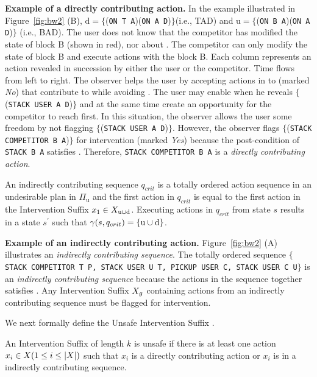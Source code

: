 \textbf{Example of a directly contributing action.} 
In the example illustrated in Figure~\ref{fig:bw2} (B), $\mathrm{d}=\lbrace$(\texttt{ON T A})(\texttt{ON A D})$\rbrace$(i.e., TAD) and $\mathrm{u}=\lbrace$(\texttt{ON B A})(\texttt{ON A D})$\rbrace$ (i.e., BAD).
The user does not know that the competitor has modified the state of block B (shown in red), nor about \undesired. 
The competitor can only modify the state of block B and execute actions with the block B.
Each column represents an action revealed in succession by either the user or the competitor. Time flows from left to right.
The observer helps the user by accepting actions in to \historyDef (marked \textit{No}) that contribute to \desired while avoiding \undesired. 
The user may enable \desired when he reveals $\lbrace$(\texttt{STACK USER A D})$\rbrace$ and at the same time create an opportunity for the competitor to reach \undesired first.
In this situation, the observer allows the user some freedom by not flagging $\lbrace$(\texttt{STACK USER A D})$\rbrace$.
However, the observer flags $\lbrace$(\texttt{STACK COMPETITOR B A})$\rbrace$ for intervention (marked \textit{Yes}) because the post-condition of \texttt{STACK B A} satisfies \undesired. Therefore, \texttt{STACK COMPETITOR B A} is a \textit{directly contributing action}.


\begin{definition}
\label{def:indirect}
An \textnormal{indirectly contributing sequence} $q_{crit}$ is a totally ordered action sequence in an undesirable plan in $\Pi_{\mathrm{u}}$ and the first action in $q_{crit}$ is equal to the first action in the Intervention Suffix $x_1 \in X_{\mathrm{u}\cup\mathrm{d}}$. Executing actions in $q_{crit}$ from state $s$ results in a state $s^\prime$ such that $\gamma(s,q_{crit})=\lbrace\mathrm{u}\cup\mathrm{d}\rbrace$.
\end{definition}
 
\textbf{Example of an indirectly contributing action.} 
 Figure~\ref{fig:bw2} (A) illustrates an \textit{indirectly contributing sequence}. 
The totally ordered sequence \texttt{$\lbrace$STACK COMPETITOR T P, STACK USER U T, PICKUP USER C, STACK USER C U$\rbrace$} is an \textit{indirectly contributing sequence} because the actions in the sequence together satisfies \dandu. 
Any Intervention Suffix $X_{g}$ containing actions from an indirectly contributing sequence must be flagged for intervention.


We next formally define the Unsafe Intervention Suffix \SuffixUnsafe.
\begin{definition}
\label{def:unsafe}
An Intervention Suffix \Suffix of length $k$ is unsafe if there is at least one action $x_i \in X (1\leq i\leq |X|)$ such that $x_i$ is a directly contributing action or $x_i$ is in a indirectly contributing sequence.
\end{definition}

